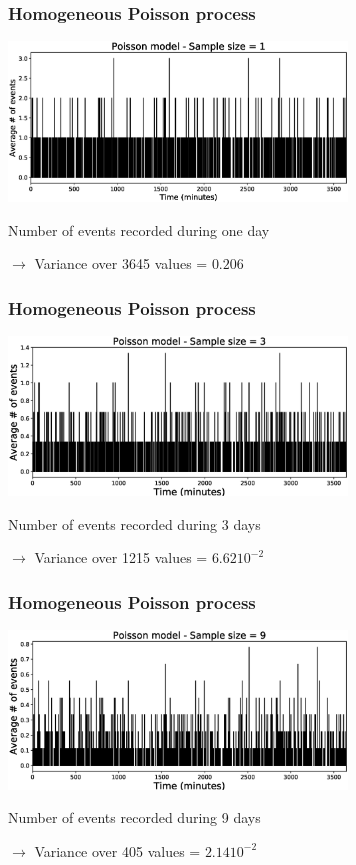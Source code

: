 \documentclass{beamer}
\begin{document}
	\begin{frame}
		\frametitle{Homogeneous Poisson process}
		\begin{center}
			\includegraphics[width=9cm, trim={1cm 0cm 3cm 0cm}, clip]{longrange/Poisson_1.eps}
		\end{center}
		Number of events recorded during one day

		$\rightarrow$ Variance over 3645 values = $0.206$
	\end{frame}

	\begin{frame}
		\frametitle{Homogeneous Poisson process}
		\begin{center}
			\includegraphics[width=9cm, trim={1cm 0cm 3cm 0cm}, clip]{longrange/Poisson_2.eps}
		\end{center}
		Number of events recorded during 3 days

		$\rightarrow$ Variance over 1215 values = $6.62 10^{-2}$
	\end{frame}

	\begin{frame}
		\frametitle{Homogeneous Poisson process}
		\begin{center}
			\includegraphics[width=9cm, trim={1cm 0cm 3cm 0cm}, clip]{longrange/Poisson_3.eps}
		\end{center}
		Number of events recorded during 9 days

		$\rightarrow$ Variance over 405 values = $2.14 10^{-2}$
	\end{frame}
\end{document}
